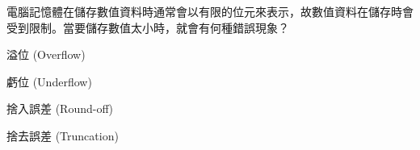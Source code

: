 \ifx\ntpcNinetyTwo\undefined[92學年基北區] \fi
電腦記憶體在儲存數值資料時通常會以有限的位元來表示，故數值資料在儲存時會受到限制。當要儲存數值太小時，就會有何種錯誤現象？
  \begin{optionlist}
  \item 溢位 (Overflow)
  \item 虧位 (Underflow)\label{ntpc-92-a3}
  \item 捨入誤差 (Round-off)
  \item 捨去誤差 (Truncation)
  \end{optionlist}